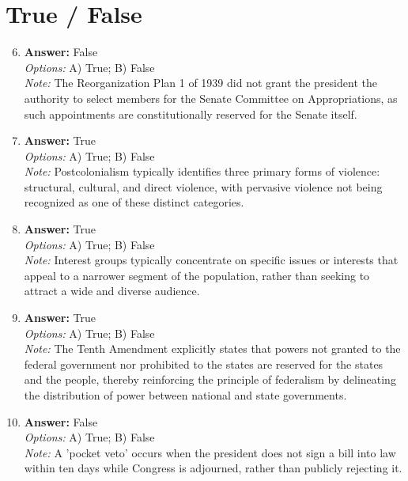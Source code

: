 \documentclass[12pt]{article}
\begin{document}
\section*{True / False}
\begin{enumerate}[label=\arabic*.]
\setcounter{enumi}{5}
\item \textbf{Answer:} False
\\ \textit{Options:} A) True; B) False
\\ \textit{Note:} The Reorganization Plan 1 of 1939 did not grant the president the authority to select members for the Senate Committee on Appropriations, as such appointments are constitutionally reserved for the Senate itself.
\item \textbf{Answer:} True
\\ \textit{Options:} A) True; B) False
\\ \textit{Note:} Postcolonialism typically identifies three primary forms of violence: structural, cultural, and direct violence, with pervasive violence not being recognized as one of these distinct categories.
\item \textbf{Answer:} True
\\ \textit{Options:} A) True; B) False
\\ \textit{Note:} Interest groups typically concentrate on specific issues or interests that appeal to a narrower segment of the population, rather than seeking to attract a wide and diverse audience.
\item \textbf{Answer:} True
\\ \textit{Options:} A) True; B) False
\\ \textit{Note:} The Tenth Amendment explicitly states that powers not granted to the federal government nor prohibited to the states are reserved for the states and the people, thereby reinforcing the principle of federalism by delineating the distribution of power between national and state governments.
\item \textbf{Answer:} False
\\ \textit{Options:} A) True; B) False
\\ \textit{Note:} A 'pocket veto' occurs when the president does not sign a bill into law within ten days while Congress is adjourned, rather than publicly rejecting it.
\end{enumerate}
\end{document}
